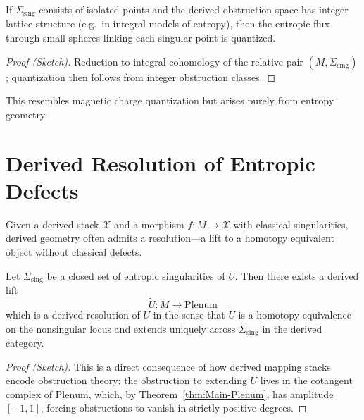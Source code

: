 \begin{proposition}
\label{prop:flux-quant}
If $\Sigma_{\mathrm{sing}}$ consists of isolated points and
the derived obstruction space has integer lattice structure
(e.g.\ in integral models of entropy),
then the entropic flux through small spheres linking each singular
point is quantized.
\end{proposition}

\begin{proof}[Proof (Sketch)]
Reduction to integral cohomology of the relative pair
$(M,\Sigma_{\mathrm{sing}})$; quantization then follows from integer
obstruction classes.
\end{proof}

\begin{remark}
This resembles magnetic charge quantization but arises purely from
entropy geometry.
\end{remark}



\section{Derived Resolution of Entropic Defects}
\label{sec:resolution}

Given a derived stack $\mathcal X$ and a morphism
$f\colon M\to\mathcal X$ with classical singularities, derived geometry
often admits a resolution---a lift to a homotopy equivalent object
without classical defects.

\begin{theorem}
\label{thm:resolution}
Let $\Sigma_{\mathrm{sing}}$ be a closed set of entropic
singularities of $U$.
Then there exists a derived lift
\[
\widetilde U\colon M\longrightarrow\mathrm{Plenum}
\]
which is a derived resolution of $U$ in the sense that
$\widetilde U$ is a homotopy equivalence on the nonsingular locus and
extends uniquely across $\Sigma_{\mathrm{sing}}$ in the derived
category.
\end{theorem}

\begin{proof}[Proof (Sketch)]
This is a direct consequence of how derived mapping stacks encode
obstruction theory: the obstruction to extending $U$ lives in the
cotangent complex of $\mathrm{Plenum}$, which, by Theorem~\ref{thm:Main-Plenum},
has amplitude $[-1,1]$, forcing obstructions to vanish in strictly
positive degrees.
\end{proof}



